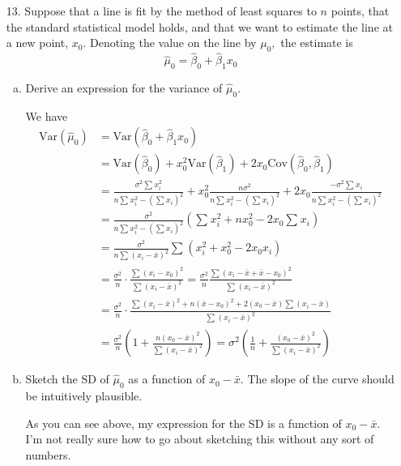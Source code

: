 \documentclass{article}
\newcommand{\var}{\mathrm{Var}}
\newcommand{\cov}{\mathrm{Cov}}
\begin{document}
\begin{itemize}
	\item[13.] Suppose that a line is fit by the method of least squares to $n$ points, that the standard statistical model holds, and that we want to estimate the line at a new point, $x_0.$ Denoting the value on the line by $\mu_0,$ the estimate is \[\hat\mu_0=\hat\beta_0+\hat\beta_1x_0\] 
		\begin{enumerate}[a.]
			\item Derive an expression for the variance of $\hat\mu_0.$
				\begin{soln}
					We have
					\begin{align*}
						\var(\hat\mu_0) &= \var(\hat\beta_0 + \hat\beta_1x_0) \\
						&= \var(\hat\beta_0) + x_0^2\var(\hat\beta_1)+2x_0\cov(\hat\beta_0, \hat\beta_1) \\
						&= \frac{\sigma^2\sum_{}^{}x_i^2}{n\sum_{}^{}x_i^2-\left( \sum_{}^{}x_i \right)^2} + x_0^2\frac{n\sigma^2}{n\sum_{}^{}x_i^2 - \left( \sum_{}^{}x_i \right)^2} + 2x_0\frac{-\sigma^2\sum_{}^{}x_i}{n\sum_{}^{}x_i^2-\left( \sum_{}^{}x_i \right)^2} \\
						&= \frac{\sigma^2}{n\sum_{}^{}x_i^2 - \left( \sum_{}^{}x_i \right)^2}\left(  \sum_{}^{}x_i^2 + nx_0^2 - 2x_0\sum_{}^{}x_i \right) \\
						&= \frac{\sigma^2}{n\sum_{}^{}(x_i-\bar x)^2}\sum_{}^{}\left(x_i^2+x_0^2-2x_0x_i \right) \\
						&= \frac{\sigma^2}{n} \cdot \frac{\sum_{}^{}(x_i-x_0)^2}{\sum_{}^{}(x_i-\bar x)^2} = \frac{\sigma^2}{n} \frac{\sum_{}^{}(x_i-\bar x+\bar x-x_0)^2}{\sum_{}^{}(x_i-\bar x)^2} \\
						&= \frac{\sigma^2}{n} \cdot \frac{\sum_{}^{}(x_i-\bar x)^2 + n(\bar x-x_0)^2 + 2(x_0-\bar x)\sum_{}^{}(x_i-\bar x)}{\sum_{}^{}(x_i-\bar x)^2} \\
						&= \frac{\sigma^2}{n} \left( 1+\frac{n(x_0-\bar x)^2}{\sum_{}^{}(x_i-\bar x)^2} \right) = \sigma^2\left( \frac{1}{n} + \frac{(x_0-\bar x)^2}{\sum_{}^{}(x_i-\bar x)^2} \right)
					\end{align*}
				\end{soln}

			\item Sketch the SD of $\hat\mu_0$ as a function of $x_0-\bar x.$ The slope of the curve should be intuitively plausible.
				\begin{answer*}
					As you can see above, my expression for the SD is a function of $x_0-\bar x.$ I'm not really sure how to go about sketching this without any sort of numbers.
				\end{answer*}


\end{enumerate}
\end{itemize}
\end{document}
